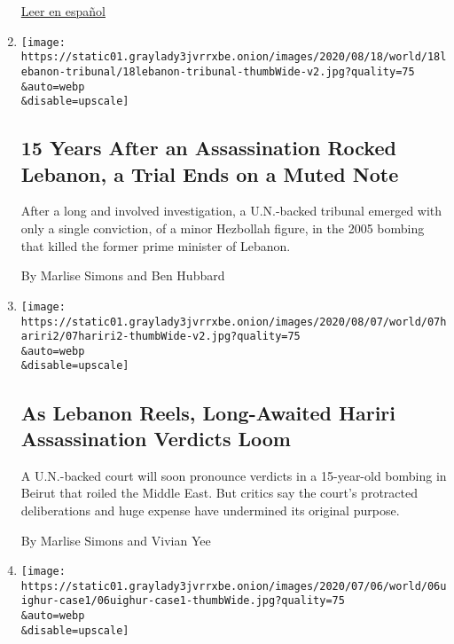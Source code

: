 \begin{enumerate}
  \href{https://www.nytimes3xbfgragh.onion/es/2020/09/08/espanol/mundo/rohinya-genocidio-birmania.html}{Leer
  en español}
\item
  \href{/2020/08/18/world/middleeast/hariri-assassination-trial-hague.html}{}

  \texttt{[image: https://static01.graylady3jvrrxbe.onion/images/2020/08/18/world/18lebanon-tribunal/18lebanon-tribunal-thumbWide-v2.jpg?quality=75\\\&auto=webp\\\&disable=upscale]}

  \hypertarget{15-years-after-an-assassination-rocked-lebanon-a-trial-ends-on-a-muted-note}{%
  \subsection{15 Years After an Assassination Rocked Lebanon, a Trial
  Ends on a Muted
  Note}\label{15-years-after-an-assassination-rocked-lebanon-a-trial-ends-on-a-muted-note}}

  After a long and involved investigation, a U.N.-backed tribunal
  emerged with only a single conviction, of a minor Hezbollah figure, in
  the 2005 bombing that killed the former prime minister of Lebanon.

  By Marlise Simons and Ben Hubbard
\item
  \href{/2020/08/08/world/middleeast/hariri-assassination-trial-hague.html}{}

  \texttt{[image: https://static01.graylady3jvrrxbe.onion/images/2020/08/07/world/07hariri2/07hariri2-thumbWide-v2.jpg?quality=75\\\&auto=webp\\\&disable=upscale]}

  \hypertarget{as-lebanon-reels-long-awaited-hariri-assassination-verdicts-loom}{%
  \subsection{As Lebanon Reels, Long-Awaited Hariri Assassination
  Verdicts
  Loom}\label{as-lebanon-reels-long-awaited-hariri-assassination-verdicts-loom}}

  A U.N.-backed court will soon pronounce verdicts in a 15-year-old
  bombing in Beirut that roiled the Middle East. But critics say the
  court's protracted deliberations and huge expense have undermined its
  original purpose.

  By Marlise Simons and Vivian Yee
\item
  \href{/2020/07/06/world/asia/china-xinjiang-uighur-court.html}{}

  \texttt{[image: https://static01.graylady3jvrrxbe.onion/images/2020/07/06/world/06uighur-case1/06uighur-case1-thumbWide.jpg?quality=75\\\&auto=webp\\\&disable=upscale]}


\end{enumerate}
